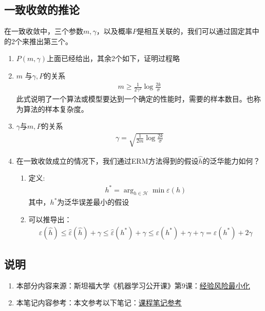 \subsection{一致收敛的推论}
在一致收敛中，三个参数$m, \gamma$，以及概率$P$是相互关联的，我们可以通过固定其中的2个来推出第三个。
\begin{enumerate}
	\item $P(m, \gamma)$上面已经给出，其余2个如下，证明过程略
	\item  $m$ 与$\gamma, P$的关系
	\begin{align}
		m \geq \frac{1}{2\gamma^2}\log\frac{2k}{\sigma}
	\end{align}
	此式说明了一个算法或模型要达到一个确定的性能时，需要的样本数目。也称为算法的样本复杂度。
	\item $\gamma$与$m, P$的关系
	\begin{align}
		\gamma = \sqrt{\frac{1}{2m}\log\frac{2k}{\sigma}}
	\end{align}

	\item 在一致收敛成立的情况下，我们通过ERM方法得到的假设$\hat{h}$的泛华能力如何？
	\begin{enumerate}
		\item 定义:
		\begin{align}
			h^* = \arg_{h\in\mathcal{H}}\min \varepsilon(h)
		\end{align}
		其中，$h^*$为泛华误差最小的假设
		\item 可以推导出：
		\begin{align}
			\varepsilon(\hat{h}) \leq \hat{\varepsilon}(\hat{h}) + \gamma \leq \hat{\varepsilon}(h^*) + \gamma \leq \varepsilon(h^*) + \gamma + \gamma
			= \varepsilon(h^*) + 2\gamma
		\end{align}


	\end{enumerate}
	{\color{red}{其余内容略，有用了再看。}}
\end{enumerate}

\subsection{说明}
\begin{enumerate}
	\item 本部分内容来源：斯坦福大学《机器学习公开课》第9课：\href{http://open.163.com/movie/2008/1/F/H/M6SGF6VB4_M6SGJV3FH.html}{经验风险最小化}
	\item 本笔记内容参考：本文参考以下笔记：\href{http://blog.csdn.net/stdcoutzyx/article/details/12110337}{课程笔记参考}
\end{enumerate}



